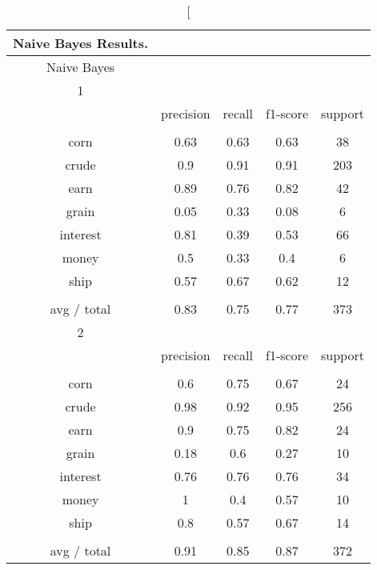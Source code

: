 \documentclass[11pt]{article}
\begin{document}
\begin{center}
\begin{longtable}{| c | c | c | c | c |}
\caption[Naive Bayes Results.} \\


\hline
Naive Bayes &           &        &          &         \\
\hline
1           &           &        &          &         \\
\hline
           & precision & recall & f1-score & support \\
           &           &        &          &         \\
corn        & 0.63      & 0.63   & 0.63     & 38      \\
crude       & 0.9       & 0.91   & 0.91     & 203     \\
earn        & 0.89      & 0.76   & 0.82     & 42      \\
grain       & 0.05      & 0.33   & 0.08     & 6       \\
interest    & 0.81      & 0.39   & 0.53     & 66      \\
money       & 0.5       & 0.33   & 0.4      & 6       \\
ship        & 0.57      & 0.67   & 0.62     & 12      \\
           &           &        &          &         \\
avg / total & 0.83      & 0.75   & 0.77     & 373     \\
\hline

2           &           &        &          &         \\
\hline
           & precision & recall & f1-score & support \\
           &           &        &          &         \\
corn        & 0.6       & 0.75   & 0.67     & 24      \\
crude       & 0.98      & 0.92   & 0.95     & 256     \\
earn        & 0.9       & 0.75   & 0.82     & 24      \\
grain       & 0.18      & 0.6    & 0.27     & 10      \\
interest    & 0.76      & 0.76   & 0.76     & 34      \\
money       & 1         & 0.4    & 0.57     & 10      \\
ship        & 0.8       & 0.57   & 0.67     & 14      \\
           &           &        &          &         \\
avg / total & 0.91      & 0.85   & 0.87     & 372     \\
\hline


\end{longtable}
\end{center}
\end{document}

